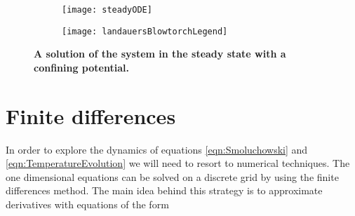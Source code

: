 %
\begin{figure}
	\center
	\begin{subfigure}{0.75\textwidth}
		\texttt{[image: steadyODE]}
	\end{subfigure}
	\begin{subfigure}{0.23\textwidth}
		\texttt{[image: landauersBlowtorchLegend]}
	\end{subfigure}
	\caption{\textbf{A solution of the system in the steady state with a confining potential.} \label{fig:steadyODE}}
\end{figure}

\section{Finite differences}  \label{numerics}
In order to explore the dynamics of equations \ref{eqn:Smoluchowski} and \ref{eqn:TemperatureEvolution} we will need to resort to numerical techniques. The one dimensional equations can be solved on a discrete grid by using the finite differences method. The main idea behind this strategy is to approximate derivatives with equations of the form

